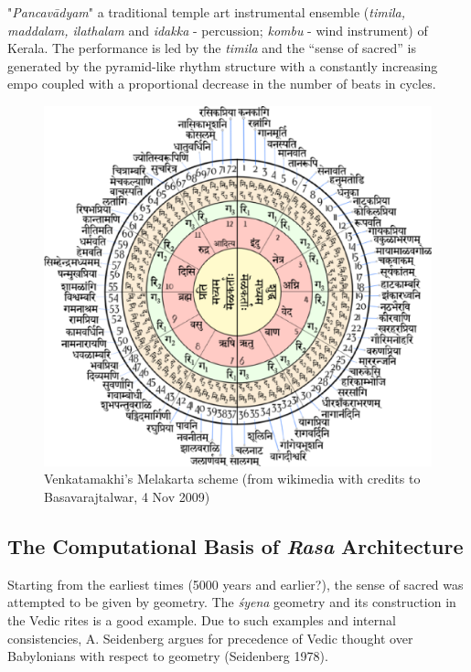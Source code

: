 "\textsl{Pancavādyam}" a traditional temple art instrumental ensemble (\textsl{timila, maddalam, ilathalam} and \textsl{idakka} - percussion; \textsl{kombu} - wind instrument) of Kerala. The performance is led by the \textsl{timila} and the “sense of sacred” is generated by the pyramid-like rhythm structure with a constantly increasing empo coupled with a proportional decrease in the number of beats in cycles.
\begin{figure}[H]
\centering
\includegraphics[scale=.4]{figures/7.eps}
\caption{Venkatamakhi’s Melakarta scheme (from wikimedia with credits to Basavarajtalwar, 4 Nov 2009)}\label{chap3-fig5}
\end{figure}

\subsection*{The Computational Basis of \textsl{Rasa} Architecture}\label{chap3-sec5.3}

Starting from the earliest times (5000 years and earlier?), the sense of sacred was attempted to be given by geometry. The \textsl{śyena} geometry and its construction in the Vedic rites is a good example. Due to such examples and internal consistencies, A. Seidenberg argues for precedence of Vedic thought over Babylonians with respect to geometry (Seidenberg 1978).

